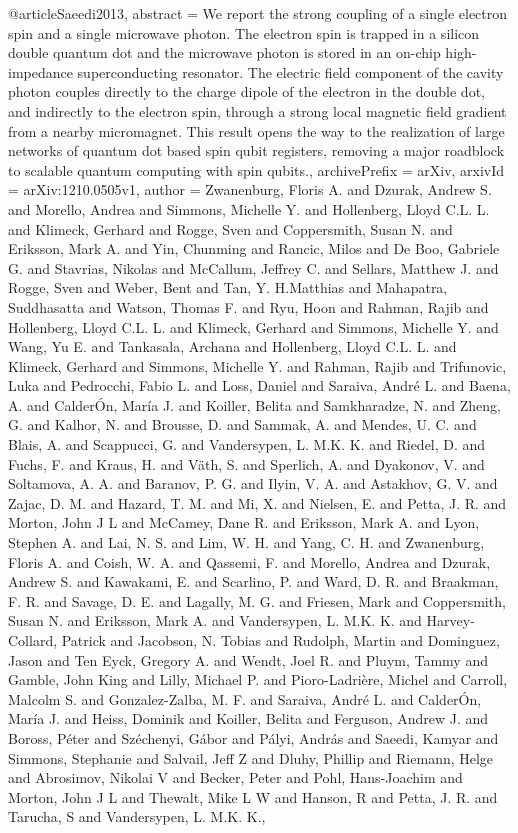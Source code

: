 @article{Saeedi2013,
abstract = {We report the strong coupling of a single electron spin and a single microwave photon. The electron spin is trapped in a silicon double quantum dot and the microwave photon is stored in an on-chip high-impedance superconducting resonator. The electric field component of the cavity photon couples directly to the charge dipole of the electron in the double dot, and indirectly to the electron spin, through a strong local magnetic field gradient from a nearby micromagnet. This result opens the way to the realization of large networks of quantum dot based spin qubit registers, removing a major roadblock to scalable quantum computing with spin qubits.},
archivePrefix = {arXiv},
arxivId = {arXiv:1210.0505v1},
author = {Zwanenburg, Floris A. and Dzurak, Andrew S. and Morello, Andrea and Simmons, Michelle Y. and Hollenberg, Lloyd C.L. L. and Klimeck, Gerhard and Rogge, Sven and Coppersmith, Susan N. and Eriksson, Mark A. and Yin, Chunming and Rancic, Milos and {De Boo}, Gabriele G. and Stavrias, Nikolas and McCallum, Jeffrey C. and Sellars, Matthew J. and Rogge, Sven and Weber, Bent and Tan, Y. H.Matthias and Mahapatra, Suddhasatta and Watson, Thomas F. and Ryu, Hoon and Rahman, Rajib and Hollenberg, Lloyd C.L. L. and Klimeck, Gerhard and Simmons, Michelle Y. and Wang, Yu E. and Tankasala, Archana and Hollenberg, Lloyd C.L. L. and Klimeck, Gerhard and Simmons, Michelle Y. and Rahman, Rajib and Trifunovic, Luka and Pedrocchi, Fabio L. and Loss, Daniel and Saraiva, Andr{\'{e}} L. and Baena, A. and Calder{\'{O}}n, Mar{\'{i}}a J. and Koiller, Belita and Samkharadze, N. and Zheng, G. and Kalhor, N. and Brousse, D. and Sammak, A. and Mendes, U. C. and Blais, A. and Scappucci, G. and Vandersypen, L. M.K. K. and Riedel, D. and Fuchs, F. and Kraus, H. and V{\"{a}}th, S. and Sperlich, A. and Dyakonov, V. and Soltamova, A. A. and Baranov, P. G. and Ilyin, V. A. and Astakhov, G. V. and Zajac, D. M. and Hazard, T. M. and Mi, X. and Nielsen, E. and Petta, J. R. and Morton, John J L and McCamey, Dane R. and Eriksson, Mark A. and Lyon, Stephen A. and Lai, N. S. and Lim, W. H. and Yang, C. H. and Zwanenburg, Floris A. and Coish, W. A. and Qassemi, F. and Morello, Andrea and Dzurak, Andrew S. and Kawakami, E. and Scarlino, P. and Ward, D. R. and Braakman, F. R. and Savage, D. E. and Lagally, M. G. and Friesen, Mark and Coppersmith, Susan N. and Eriksson, Mark A. and Vandersypen, L. M.K. K. and Harvey-Collard, Patrick and Jacobson, N. Tobias and Rudolph, Martin and Dominguez, Jason and {Ten Eyck}, Gregory A. and Wendt, Joel R. and Pluym, Tammy and Gamble, John King and Lilly, Michael P. and Pioro-Ladri{\`{e}}re, Michel and Carroll, Malcolm S. and Gonzalez-Zalba, M. F. and Saraiva, Andr{\'{e}} L. and Calder{\'{O}}n, Mar{\'{i}}a J. and Heiss, Dominik and Koiller, Belita and Ferguson, Andrew J. and Boross, P{\'{e}}ter and Sz{\'{e}}chenyi, G{\'{a}}bor and P{\'{a}}lyi, Andr{\'{a}}s and Saeedi, Kamyar and Simmons, Stephanie and Salvail, Jeff Z and Dluhy, Phillip and Riemann, Helge and Abrosimov, Nikolai V and Becker, Peter and Pohl, Hans-Joachim and Morton, John J L and Thewalt, Mike L W and Hanson, R and Petta, J. R. and Tarucha, S and Vandersypen, L. M.K. K.},
}
